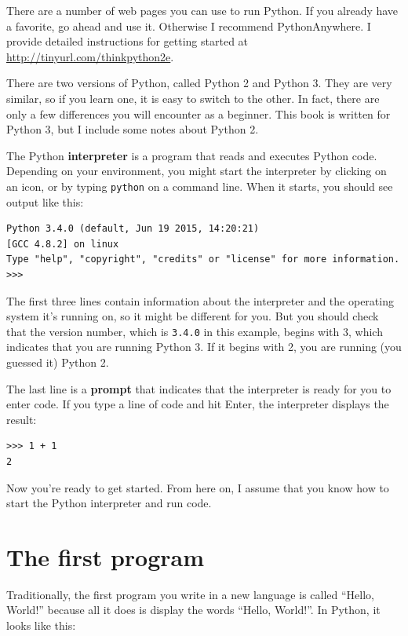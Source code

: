 \documentclass[10pt]{book}
\begin{document}
There are a number of web pages you can use to run Python.  If you
already have a favorite, go ahead and use it.  Otherwise I recommend
PythonAnywhere.  I provide detailed instructions for getting started
at \url{http://tinyurl.com/thinkpython2e}.  

There are two versions of Python, called Python 2 and Python 3.
They are very similar, so if you learn one, it is easy to switch
to the other.  In fact, there are only a few differences you will
encounter as a beginner.
This book is written for Python 3, but I include some notes
about Python 2.

The Python {\bf interpreter} is a program that reads and executes
Python code.  Depending on your environment, you might start the
interpreter by clicking on an icon, or by typing {\tt python} on
a command line. 
When it starts, you should see output like this:

\begin{verbatim}
Python 3.4.0 (default, Jun 19 2015, 14:20:21) 
[GCC 4.8.2] on linux
Type "help", "copyright", "credits" or "license" for more information.
>>> 
\end{verbatim}
%
The first three lines contain information about the interpreter
and the operating system it's running on, so it might be different for
you.  But you should check that the version number, which is
{\tt 3.4.0} in this example, begins with 3, which indicates that
you are running Python 3.  If it begins with 2, you are running
(you guessed it) Python 2.

The last line is a {\bf prompt} that indicates that the interpreter is
ready for you to enter code.
If you type a line of code and hit Enter, the interpreter displays the
result: 

\begin{verbatim}
>>> 1 + 1
2
\end{verbatim}
%
Now you're ready to get started.
From here on, I assume that you know how to start the Python
interpreter and run code.


\section{The first program}
\label{hello}

Traditionally, the first program you write in a new language
is called ``Hello, World!'' because all it does is display the
words ``Hello, World!''.  In Python, it looks like this:
\end{document}
